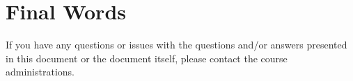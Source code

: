 \documentclass[a4paper,11pt,oneside]{book}
\begin{document}
\begin{sloppypar}
\chapter{Final Words}
\label{finalWords}
If you have any questions or issues with the questions and/or answers presented in this document or the document itself, please contact the course administrations.

\pagebreak

\printbibliography

\end{sloppypar}
\end{document}

